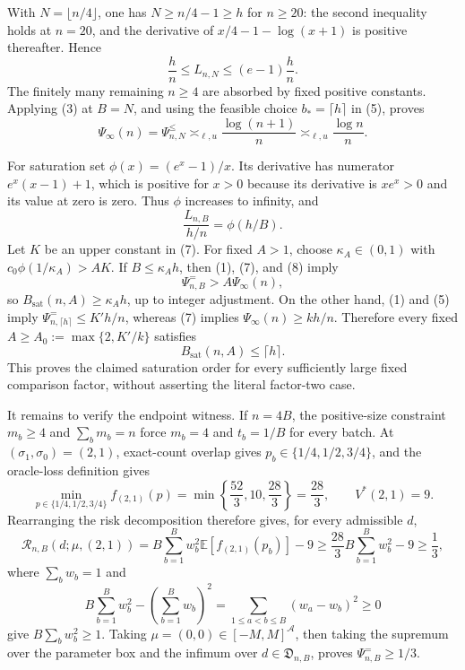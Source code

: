 With \(N=\lfloor n/4\rfloor\), one has \(N\geq n/4-1\geq h\) for \(n\geq20\): the second inequality holds at \(n=20\), and the derivative of \(x/4-1-\log(x+1)\) is positive thereafter. Hence
\[
\frac{h}{n}\leq L_{n,N}\leq(e-1)\frac{h}{n}.       \tag{6}
\]
The finitely many remaining \(n\geq4\) are absorbed by fixed positive constants. Applying (3) at \(B=N\), and using the feasible choice \(b_*=\lceil h\rceil\) in (5), proves
\[
\Psi_\infty(n)=\Psi^{\leq}_{n,N}
\asymp_{\ell,u}\frac{\log(n+1)}{n}
\asymp_{\ell,u}\frac{\log n}{n}.                  \tag{7}
\]

For saturation set \(\phi(x)=(e^x-1)/x\). Its derivative has numerator \(e^x(x-1)+1\), which is positive for \(x>0\) because its derivative is \(xe^x>0\) and its value at zero is zero. Thus \(\phi\) increases to infinity, and
\[
\frac{L_{n,B}}{h/n}=\phi(h/B).                       \tag{8}
\]
Let \(K\) be an upper constant in (7). For fixed \(A>1\), choose \(\kappa_A\in(0,1)\) with \(c_0\phi(1/\kappa_A)>AK\). If \(B\leq\kappa_Ah\), then (1), (7), and (8) imply
\[
\Psi^{=}_{n,B}>A\Psi_\infty(n),                    \tag{9}
\]
so \(B_{\mathrm{sat}}(n,A)\geq\kappa_Ah\), up to integer adjustment. On the other hand, (1) and (5) imply
\(\Psi^{=}_{n,\lceil h\rceil}\leq K'h/n\), whereas (7) implies
\(\Psi_\infty(n)\geq kh/n\). Therefore every fixed
\(A\geq A_0:=\max\{2,K'/k\}\) satisfies
\[
B_{\mathrm{sat}}(n,A)\leq\lceil h\rceil.           \tag{10}
\]
This proves the claimed saturation order for every sufficiently large fixed comparison factor, without asserting the literal factor-two case.

It remains to verify the endpoint witness. If \(n=4B\), the positive-size constraint \(m_b\geq4\) and \(\sum_bm_b=n\) force \(m_b=4\) and \(t_b=1/B\) for every batch. At \((\sigma_1,\sigma_0)=(2,1)\), exact-count overlap gives \(p_b\in\{1/4,1/2,3/4\}\), and the oracle-loss definition gives
\[
\min_{p\in\{1/4,1/2,3/4\}}f_{(2,1)}(p)
=\min\left\{\frac{52}{3},10,\frac{28}{3}\right\}
=\frac{28}{3},
\qquad V^*(2,1)=9.                                  \tag{11}
\]
Rearranging the risk decomposition therefore gives, for every admissible \(d\),
\[
\mathcal R_{n,B}(d;\mu,(2,1))
=B\sum_{b=1}^Bw_b^2\mathbb E[f_{(2,1)}(p_b)]-9
\geq\frac{28}{3}B\sum_{b=1}^Bw_b^2-9
\geq\frac13,                                        \tag{12}
\]
where \(\sum_bw_b=1\) and
\[
B\sum_{b=1}^Bw_b^2-\left(\sum_{b=1}^Bw_b\right)^2
=\sum_{1\leq a<b\leq B}(w_a-w_b)^2\geq0
\]
give \(B\sum_bw_b^2\geq1\). Taking \(\mu=(0,0)\in[-M,M]^{\mathcal A}\), then taking the supremum over the parameter box and the infimum over \(d\in\mathfrak D_{n,B}\), proves \(\Psi^{=}_{n,B}\geq1/3\).
